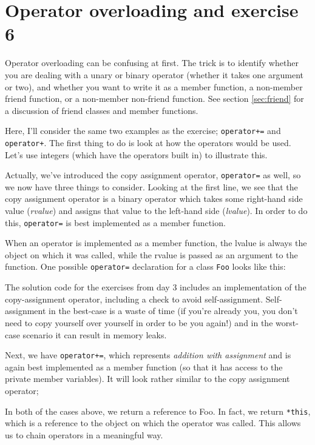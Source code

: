 \documentclass[a4paper]{scrartcl}
\begin{document}
\section{Operator overloading and exercise 6}
Operator overloading can be confusing at first. The trick is to identify whether you are dealing with a unary or binary operator (whether it takes one argument or two), and whether you want to write it as a member function, a non-member friend function, or a non-member non-friend function. See section \ref{sec:friend} for a discussion of friend classes and member functions.

Here, I'll consider the same two examples as the exercise; \verb|operator+=| and \verb|operator+|.  The first thing to do is look at how the operators would be used. Let's use integers (which have the operators built in) to illustrate this.  



Actually, we've introduced the copy assignment operator, \verb|operator=| as well, so we now have three things to consider. Looking at the first line, we see that the copy assignment operator is a binary operator which takes some right-hand side value (\emph{rvalue}) and assigns that value to the left-hand side (\emph{lvalue}). In order to do this, \verb|operator=| is best implemented as a member function.

When an operator is implemented as a member function, the lvalue is always the object on which it was called, while the rvalue is passed as an argument to the function. One possible \verb|operator=| declaration for a class \verb|Foo| looks like this:



The solution code for the exercises from day 3 includes an implementation of the copy-assignment operator, including a check to avoid self-assignment. Self-assignment in the best-case is a waste of time (if you're already you, you don't need to copy yourself over yourself in order to be you again!) and in the worst-case scenario it can result in memory leaks.

Next, we have \verb|operator+=|, which represents \emph{addition with assignment} and is again best implemented as a member function (so that it has access to the private member variables). It will look rather similar to the copy assignment operator;



In both of the cases above, we return a reference to Foo. In fact, we return \verb|*this|, which is a reference to the object on which the operator was called. This allows us to chain operators in a meaningful way.  
\end{document}
